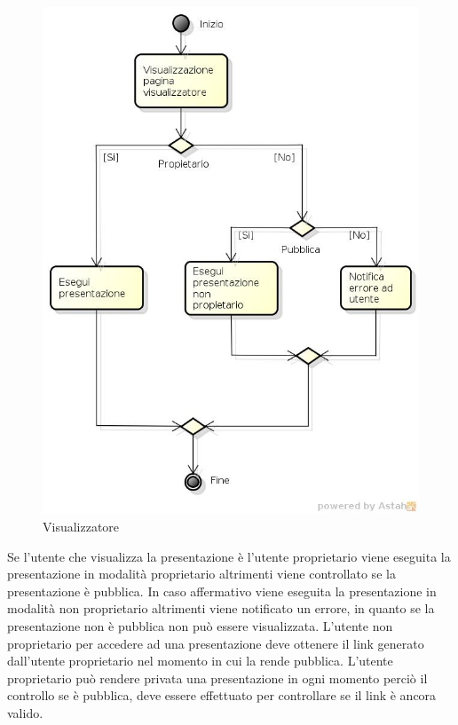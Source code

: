\begin{figure}[h!]
		\centering
		\includegraphics[scale=.2]{img/Visualizzatore.jpg}
		\caption{Visualizzatore}
		\label{fig:ModelloSpy}
\end{figure} 

Se l'utente che visualizza la presentazione è l'utente proprietario viene eseguita la presentazione in modalità proprietario altrimenti viene controllato se la presentazione è pubblica. In caso affermativo viene eseguita la presentazione in modalità non proprietario altrimenti viene notificato un errore, in quanto se la presentazione non è pubblica non può essere visualizzata. L'utente non proprietario per accedere ad una presentazione deve ottenere il link generato dall'utente proprietario nel momento in cui la rende pubblica. L'utente proprietario può rendere privata una presentazione in ogni momento perciò il controllo se è pubblica, deve essere effettuato per controllare se il link è ancora valido.

